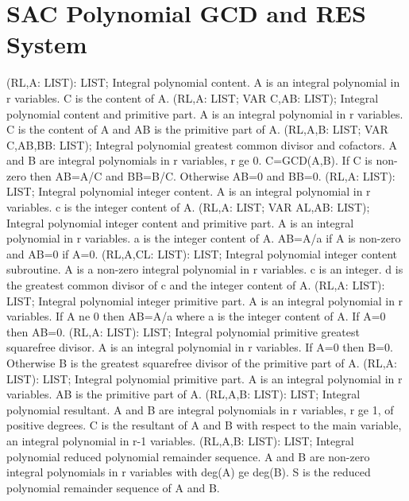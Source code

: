 \section{ SAC Polynomial GCD and RES System  } 
 (RL,A: LIST): LIST; \eproc
\bcom Integral polynomial content. A is an integral polynomial in r
variables. C is the content of A. \ecom 
{} (RL,A: LIST; VAR C,AB: LIST); \eproc
\bcom Integral polynomial content and primitive part. A is an integral
polynomial in r variables.  C is the content of A and AB is the
primitive part of A. \ecom 
{} (RL,A,B: LIST; VAR C,AB,BB: LIST); \eproc
\bcom Integral polynomial greatest common divisor and cofactors. A and B
are integral polynomials in r variables, r ge 0.  C=GCD(A,B).
If C is non-zero then AB=A/C and BB=B/C. Otherwise AB=0 and BB=0. \ecom 
{} (RL,A: LIST): LIST; \eproc
\bcom Integral polynomial integer content. A is an integral polynomial in
r variables. c is the integer content of A. \ecom 
{} (RL,A: LIST; VAR AL,AB: LIST); \eproc
\bcom Integral polynomial integer content and primitive part. A is an
integral polynomial in r variables.  a is the integer content of A.
AB=A/a if A is non-zero and AB=0 if A=0. \ecom 
{} (RL,A,CL: LIST): LIST; \eproc
\bcom Integral polynomial integer content subroutine. A is a non-zero
integral polynomial in r variables.  c is an integer.  d is the
greatest common divisor of c and the integer content of A. \ecom 
{} (RL,A: LIST): LIST; \eproc
\bcom Integral polynomial integer primitive part. A is an integral
polynomial in r variables.  If A ne 0 then AB=A/a where a is the
integer content of A. If A=0 then AB=0. \ecom 
{} (RL,A: LIST): LIST; \eproc
\bcom Integral polynomial primitive greatest squarefree divisor. A is an
integral polynomial in r variables.  If A=0 then B=0.  Otherwise B is
the greatest squarefree divisor of the primitive part of A. \ecom 
{} (RL,A: LIST): LIST; \eproc
\bcom Integral polynomial primitive part. A is an integral polynomial in
r variables. AB is the primitive part of A. \ecom 
{} (RL,A,B: LIST): LIST; \eproc
\bcom Integral polynomial resultant. A and B are integral polynomials in
r variables, r ge 1, of positive degrees.  C is the resultant of A and
B with respect to the main variable, an integral polynomial in r-1
variables. \ecom 
{} (RL,A,B: LIST): LIST; \eproc
\bcom Integral polynomial reduced polynomial remainder sequence. A and B
are non-zero integral polynomials in r variables with deg(A) ge deg(B).
S is the reduced polynomial remainder sequence of A and B. \ecom 
